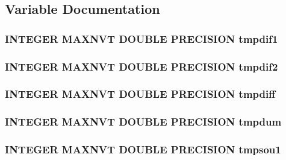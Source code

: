 \subsection{Variable Documentation}
\hypertarget{tdebug_8com_a7d0989f9a38016617ca1bc61561d66ff}{
\subsubsection[{tmpdif1}]{\setlength{\rightskip}{0pt plus 5cm}I\-N\-T\-E\-G\-E\-R M\-A\-X\-N\-V\-T D\-O\-U\-B\-L\-E P\-R\-E\-C\-I\-S\-I\-O\-N tmpdif1}}\label{tdebug_8com_a7d0989f9a38016617ca1bc61561d66ff}
\hypertarget{tdebug_8com_ab964a6f708f4f29204794080b9468323}{
\subsubsection[{tmpdif2}]{\setlength{\rightskip}{0pt plus 5cm}I\-N\-T\-E\-G\-E\-R M\-A\-X\-N\-V\-T D\-O\-U\-B\-L\-E P\-R\-E\-C\-I\-S\-I\-O\-N tmpdif2}}\label{tdebug_8com_ab964a6f708f4f29204794080b9468323}
\hypertarget{tdebug_8com_a5fcc422c86549ee48051b12b4b0b9003}{
\subsubsection[{tmpdiff}]{\setlength{\rightskip}{0pt plus 5cm}I\-N\-T\-E\-G\-E\-R M\-A\-X\-N\-V\-T D\-O\-U\-B\-L\-E P\-R\-E\-C\-I\-S\-I\-O\-N tmpdiff}}\label{tdebug_8com_a5fcc422c86549ee48051b12b4b0b9003}
\hypertarget{tdebug_8com_a85a53731c75ba4f8b2fb687cdcbe3f66}{
\subsubsection[{tmpdum}]{\setlength{\rightskip}{0pt plus 5cm}I\-N\-T\-E\-G\-E\-R M\-A\-X\-N\-V\-T D\-O\-U\-B\-L\-E P\-R\-E\-C\-I\-S\-I\-O\-N tmpdum}}\label{tdebug_8com_a85a53731c75ba4f8b2fb687cdcbe3f66}
\hypertarget{tdebug_8com_a023b3a6f5da0440dce335a556cb89fe6}{
\subsubsection[{tmpsou1}]{\setlength{\rightskip}{0pt plus 5cm}I\-N\-T\-E\-G\-E\-R M\-A\-X\-N\-V\-T D\-O\-U\-B\-L\-E P\-R\-E\-C\-I\-S\-I\-O\-N tmpsou1}}\label{tdebug_8com_a023b3a6f5da0440dce335a556cb89fe6}
